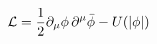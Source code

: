 \begin{equation}
{\cal L}=\frac{1}{2}\partial _{\mu }\phi \,\partial ^{\mu
}\bar{\phi} -U(|\phi |)  \label{L}
\end{equation}

